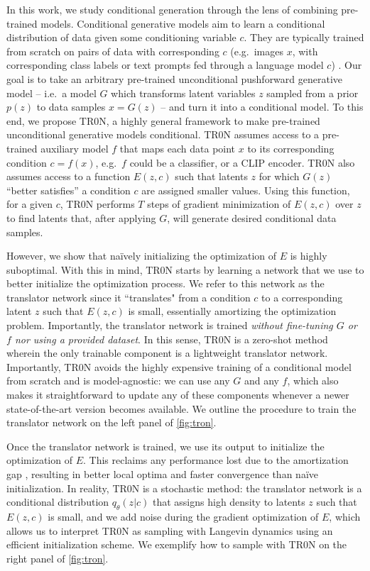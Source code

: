 \documentclass[nohyperref]{article}
\theoremstyle{plain}
\theoremstyle{definition}
\theoremstyle{remark}
\begin{document}
In this work, we study conditional generation through the lens of combining pre-trained models. 
Conditional generative models aim to learn a conditional distribution of data given some conditioning variable $c$. 
They are typically trained from scratch on pairs of data with corresponding $c$ (e.g.\ images $x$, with corresponding class labels or text prompts fed through a language model $c$) \citep{mirza2014conditional, sohn2015learning}. Our goal is to take an arbitrary pre-trained unconditional pushforward generative model \citep{salmona2022can, ross2022neural} --  i.e.\ a model $G$ which transforms latent variables $z$ sampled from a prior $p(z)$ to data samples $x = G(z)$ -- and turn it into a conditional model. To this end, we propose TR0N, a highly general framework to make pre-trained unconditional generative models conditional. TR0N assumes access to a pre-trained auxiliary model $f$ that maps each data point $x$ to its corresponding condition $c=f(x)$, e.g.\ $f$ could be a classifier, or a CLIP encoder. TR0N also assumes access to a function $E(z, c)$ such that latents $z$ for which $G(z)$ ``better satisfies'' a condition $c$ are assigned smaller values. Using this function, for a given $c$, TR0N performs $T$ steps of gradient minimization of $E(z,c)$ over $z$ to find latents that, after applying $G$, will generate desired conditional data samples.

However, we show that na\"ively initializing the optimization of $E$ is highly suboptimal. With this in mind, TR0N starts by learning a network that we use to better initialize the optimization process. We refer to this network as the translator network since it ``translates" from a condition $c$ to a corresponding latent $z$ such that $E(z,c)$ is small, essentially amortizing the optimization problem. Importantly, the translator network is trained \emph{without fine-tuning $G$ or $f$ nor using a provided dataset}. In this sense, TR0N is a zero-shot method wherein the only trainable component is a lightweight translator network. Importantly, TR0N avoids the highly expensive training of a conditional model from scratch and is model-agnostic: we can use any $G$ and any $f$, which also makes it straightforward to update any of these components whenever a newer state-of-the-art version becomes available. We outline the procedure to train the translator network on the left panel of \autoref{fig:tron}.

Once the translator network is trained, we use its output to initialize the optimization of $E$. This reclaims any performance lost due to the amortization gap \citep{cremer2018inference,kim2018semi}, resulting in better local optima and faster convergence than na\"ive initialization. In reality, TR0N is a stochastic method: the translator network is a conditional distribution $q_\theta(z|c)$ that assigns high density to latents $z$ such that $E(z,c)$ is small, and we add noise during the gradient optimization of $E$, which allows us to interpret TR0N as sampling with Langevin dynamics \citep{welling2011bayesian} using an efficient initialization scheme. We exemplify how to sample with TR0N on the right panel of \autoref{fig:tron}.
\end{document}
